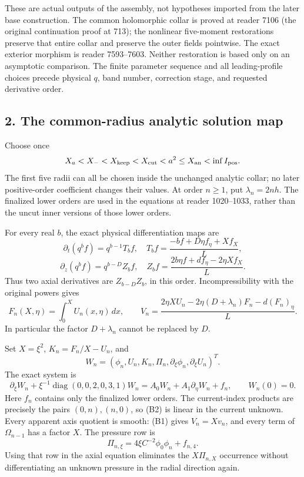 \documentclass[10pt,a4paper]{article}
\begin{document}
These are actual outputs of the assembly, not hypotheses imported from the later base construction. The common holomorphic collar is proved at reader 7106 (the original continuation proof at 713); the nonlinear five-moment restorations preserve that entire collar and preserve the outer fields pointwise. The exact exterior morphism is reader 7593--7603. Neither restoration is based only on an asymptotic comparison. The finite parameter sequence and all leading-profile choices precede physical \(q\), band number, correction stage, and requested derivative order.

\subsection{2. The common-radius analytic solution map}\label{gclosure:the-common-radius-analytic-solution-map}

Choose once \[
X_a<X_-<X_{\rm keep}<X_{\rm cut}<a^2\le X_{\rm an}<\inf I_{\rm pos}.
\] The first five radii can all be chosen inside the unchanged analytic collar; no later positive-order coefficient changes their values. At order \(n\ge1\), put \(\lambda_n=2nh\). The finalized lower orders are used in the equations at reader 1020--1033, rather than the uncut inner versions of those lower orders.

For every real \(b\), the exact physical differentiation maps are \[
\partial_t(q^bf)=q^{b-1}T_bf,\quad
T_bf=\frac{-bf+D\eta f_\eta+Xf_X}{L},
\] \[
\partial_z(q^bf)=q^{b-D}Z_bf,\quad
Z_bf=\frac{2b\eta f+df_\eta-2\eta Xf_X}{L}.
\] Thus two axial derivatives are \(Z_{b-D}Z_b\), in this order. Incompressibility with the original powers gives \[
F_n(X,\eta)=\int_0^XU_n(x,\eta)\,dx,
\qquad
V_n=\frac{2\eta XU_n-2\eta(D+\lambda_n)F_n-d(F_n)_\eta}{L}.
\tag{B1}
\] In particular the factor \(D+\lambda_n\) cannot be replaced by \(D\).

Set \(X=\xi^2\), \(K_n=F_n/X-U_n\), and \[
W_n=(\phi_n,U_n,K_n,\Pi_n,\partial_\xi\phi_n,\partial_\xi U_n)^T.
\] The exact system is \[
\partial_\xi W_n+\xi^{-1}\operatorname{diag}(0,0,2,0,3,1)W_n
=A_0W_n+A_1\partial_\eta W_n+f_n,
\qquad W_n(0)=0.
\tag{B2}
\] Here \(f_n\) contains only the finalized lower orders. The current-index products are precisely the pairs \((0,n),(n,0)\), so (B2) is linear in the current unknown. Every apparent axis quotient is smooth: (B1) gives \(V_n=Xv_n\), and every term of \(\Omega_{n-1}\) has a factor \(X\). The pressure row is \[
\Pi_{n,\xi}=4\xi C^{-2}\phi_0\phi_n+f_{n,4}.
\] Using that row in the axial equation eliminates the \(X\Pi_{n,X}\) occurrence without differentiating an unknown pressure in the radial direction again.
\end{document}
